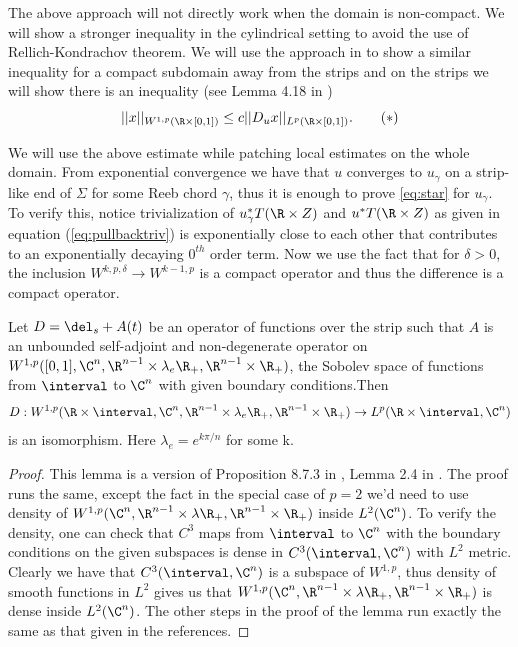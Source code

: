  The above approach will not directly work when the domain is non-compact. We will show a stronger inequality in the cylindrical setting to avoid the use of Rellich-Kondrachov theorem. We will use the approach in \cite{wendlSFT} to show a similar inequality for a compact subdomain away from the strips and on the strips we will show there is an inequality  (see  Lemma 4.18 in \cite{wendlSFT})  
            \begin{equation} 
            ||x||_{W^{1,p}(\R \times [0,1])}\leq c||D_ux||_{L^p(\R \times [0,1])}. \tag{$*$}\label{eq:star}
            \end{equation}

We will use the above estimate while patching local estimates on the whole domain. From exponential convergence we have that $u$ converges to $u_\gamma$ on a strip-like end of $\Sigma$ for some Reeb chord $\gamma$, thus it is enough to prove \eqref{eq:star} for $u_\gamma$. To verify this, notice trivialization of $u_{\gamma} ^* T(\R \times Z)$ and $u ^* T(\R \times Z)$ as given in equation (\ref{eq:pullbacktriv}) is exponentially close to each other that contributes to an exponentially decaying $0^{th}$ order term. Now we use the fact that for $\delta >0$, the inclusion $W^{k,p,\delta} \to  W^{k-1,p}$ is a compact operator and thus the difference is a compact operator.


\begin{lemma}\label{operatoriso}
Let $D=\del_s+  A(t)$ be an operator of functions over the strip such that $A$ is an unbounded self-adjoint and non-degenerate operator on $W^{1,p} ([0,1],\C^n,\R^{n-1}\times\lambda_e \R_+, \R^{n-1}\times \R_+)$, the Sobolev space of functions from $\interval$ to $\C^n$ with given boundary conditions.Then $$D:W^{1,p} (\R \times \interval,\C^n ,\R^{n-1}\times \lambda_e \R_+ ,\R^{n-1}\times \R_+  ) \to L^{p} (\R \times \interval,\C^n)$$ is an isomorphism. Here $\lambda_e = e^{k\pi/n}$ for some k. 
\end{lemma}

\begin{proof}
This lemma is a version of Proposition 8.7.3 in \cite{AudDam}, Lemma 2.4 in \cite{salamonNotes}. The proof runs the same, except the fact in the special case of $p=2$  we'd need to use density of $W^{1,p} (\C^n ,\R^{n-1}\times \lambda \R_+ ,\R^{n-1}\times \R_+  ) $ inside $ L^{2} (\C^n)$. To verify the density, one can check that $C^3$ maps from $\interval$ to $\C^n$ with the boundary conditions on the given subspaces is dense in $C^3(\interval,\C^n)$ with $L^2$ metric. Clearly we have that $C^3(\interval,\C^n)$ is a subspace of $W^{1,p}$, thus density of smooth functions in $L^2$ gives us that $W^{1,p} (\C^n ,\R^{n-1}\times \lambda \R_+ ,\R^{n-1}\times \R_+  ) $ is dense inside $ L^{2} (\C^n)$. The other steps in the proof of the lemma run exactly the same as that given in the references.
\end{proof}


